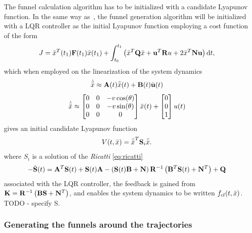 The funnel calculation algorithm has to be initialized with a candidate Lyapunov
function. In the same way
as~\cite[Majumdar]{majumdarFunnelLibrariesRealtime2017}, the funnel generation
algorithm will be initialized with a \ac{LQR} controller as the initial Lyapunov
function employing a cost function of the form
\begin{equation}
  J = \bar{x}^{T} (t_1) \mathbf{F}(t_1) \bar{x} (t_1) + \int_{t_{0}}^{t_{1}} \left( \bar{x}^{T} \mathbf{Q} \bar{x} + \mathbf{u}^{T} \mathbf{R} u + 2 \bar{x}^T \mathbf{N} \mathbf{u} \right) \mathrm{d}t,
\end{equation}
which when employed on the linearization of the system dynamics
\begin{equation}
  \dot{\bar{\bar{x}}} \approx \mathbf{A} (t)\bar{\bar{x}}(t) + \mathbf{B}(t) \bar{\mathbf{u}}(t)
\end{equation}
\begin{equation}
  \dot{\bar{\x}} \approx %
  \begin{bmatrix}
    0 & 0 & -v\cos(\theta) \\
    0 & 0 & -v\sin(\theta) \\
    0 & 0 & 0 \\
  \end{bmatrix} %
  \x (t) %
  + %
  \begin{bmatrix}
    0 \\ 0 \\ 1
  \end{bmatrix} %
  u(t)
\end{equation} 
gives an initial candidate Lyapunov function
\begin{equation}
  V(t,\bar{x}) = {\bar{\bar{x}}}^{T} \mathbf{S}_{i}\bar{\bar{x}}.
\end{equation}
where \(S_{i}\) is a solution of the \textit{Ricatti} \cref{eq:ricatti}
\begin{equation}
  \label{eq:ricatti}
  - \dot{\mathbf{S}}(t) = \mathbf{A}^{T} \mathbf{S}(t) +\mathbf{S}(t) \mathbf{A} - \left( \mathbf{S}(t) \mathbf{B} + \mathbf{N} \right) \mathbf{R}^{-1}\left( \mathbf{B}^{T} \mathbf{S}(t) + \mathbf{N}^{T} \right) + \mathbf{Q}
\end{equation} 
associated with the \ac{LQR} controller, the feedback is gained from \(\mathbf{K} =
\mathbf{R}^{-1}\left( \mathbf{B} \mathbf{S} + \mathbf{N}^T \right)\), and enables the system dynamics to be written
\(f_{cl}(t,\bar{x})\). TODO - specify S.

\subsubsection{Generating the funnels around the trajectories}
\label{subsec:generating-funnels}

